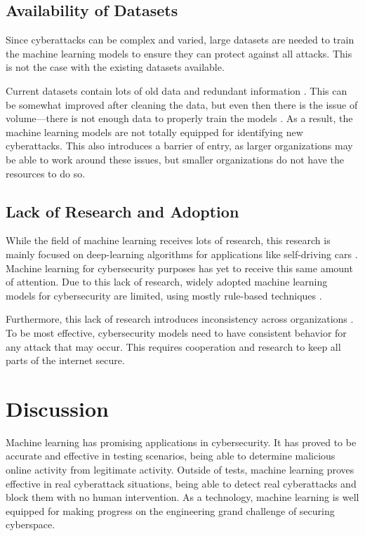 \subsection{Availability of Datasets}
Since cyberattacks can be complex and varied, large datasets are needed to train the machine learning models to ensure they can protect against all attacks.
This is not the case with the existing datasets available.

Current datasets contain lots of old data and redundant information \cite{xin2018}.
This can be somewhat improved after cleaning the data, but even then there is the issue of volume---there is not enough data to properly train the models \cite{xin2018}.
As a result, the machine learning models are not totally equipped for identifying new cyberattacks.
This also introduces a barrier of entry, as larger organizations may be able to work around these issues, but smaller organizations do not have the resources to do so.

\subsection{Lack of Research and Adoption}
While the field of machine learning receives lots of research, this research is mainly focused on deep-learning algorithms for applications like self-driving cars \cite{grandchallenge2019}.
Machine learning for cybersecurity purposes has yet to receive this same amount of attention.
Due to this lack of research, widely adopted machine learning models for cybersecurity are limited, using mostly rule-based techniques \cite{grandchallenge2019}.

Furthermore, this lack of research introduces inconsistency across organizations \cite{grandchallenge2019}.
To be most effective, cybersecurity models need to have consistent behavior for any attack that may occur.
This requires cooperation and research to keep all parts of the internet secure.

\section{Discussion}
Machine learning has promising applications in cybersecurity.
It has proved to be accurate and effective in testing scenarios, being able to determine malicious online activity from legitimate activity.
Outside of tests, machine learning proves effective in real cyberattack situations, being able to detect real cyberattacks and block them with no human intervention.
As a technology, machine learning is well equipped for making progress on the engineering grand challenge of securing cyberspace.

